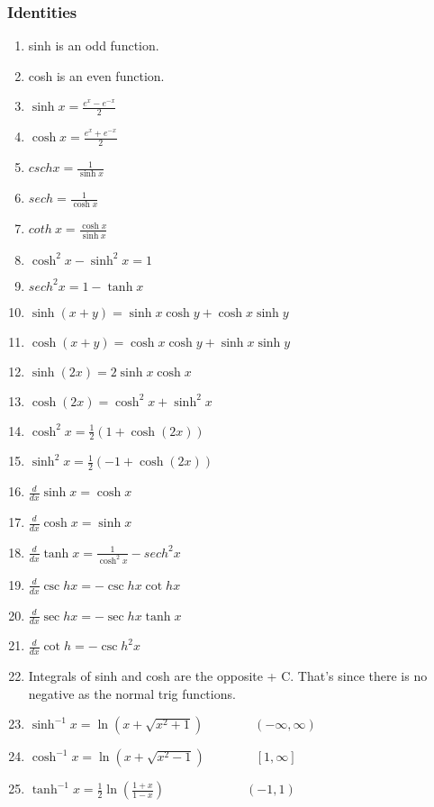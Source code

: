 \documentclass{article}
\begin{document}
\subsubsection{Identities}
\begin{enumerate}[1.]
	\item sinh is an odd function.
	\item cosh is an even function.
	\item $	\sinh x = \frac{ e^x - e^{-x}}{ 2  }$
	\item $	\cosh x = \frac{ e^x + e^{-x}}{ 2} $
\item $	csch x = \frac{1}{\sinh x} $
\item ${sech} = \frac{1}{\cosh x} $
\item $ cot{h}\ x = \frac{\cosh x}{\sinh x} $ 
\item $ \cosh^2 x - \sinh^2x = 1 $
\item $sech^2 x = 1- \tanh x$
\item $ \sinh(x+y) = \sinh x \cosh y + \cosh x \sinh y $
\item $ \cosh(x+y) = \cosh x \cosh y + \sinh x \sinh y $
\item $ \sinh(2x) = 2 \sinh x \cosh x$ 
\item $ \cosh(2x) = \cosh^2x+ \sinh^2x $ 
\item $ \cosh^2x = \frac{1}{2} (1+ \cosh(2x)) $ 
\item $ \sinh^2x = \frac{1}{2} (-1+ \cosh(2x)) $ 


\item 		
$	\frac{d}{dx} \sinh x = \cosh x $
\item $ \frac{d}{dx} \cosh x = \sinh x $ 
	\item $ \frac{d}{dx} \tanh x = \frac{1}{\cosh^2 x} - sech^2 x $
		\item $ \frac{d}{dx} \csc h x = - \csc h x \cot h x $ 
			\item $ \frac{d}{dx} \sec h x = - \sec h x \tanh x $ 
				\item $ \frac{d}{dx} \cot h = - \csc h ^2 x $
		\item Integrals of sinh and cosh are the opposite + C. That's since there is no negative as the normal trig functions.


		\item $ \sinh^{-1}x = \ln(x+ \sqrt{ x^2 +1}) \qquad \qquad (- \infty , \infty )$
		\item $ \cosh^{-1}x = \ln(x+ \sqrt{x^2-1}) \qquad \qquad [1, \infty]$ 
		\item $ \tanh^{-1}x = \frac{1}{2} \ln( \frac{ 1+x }{ 1-x }   ) \qquad \qquad \qquad \ \  (-1,1)$ 


\end{enumerate}
\end{document}
